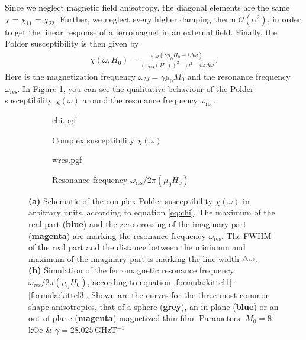 Since we neglect magnetic field anisotropy, the diagonal elements are the same $\chi=\chi_{11}=\chi_{22}$. Further, we neglect every higher damping therm $\mathcal{O}(\alpha^2)$, in order to get the linear response of a ferromagnet in an external field. Finally, the Polder susceptibility is then given by
\begin{align}
    \chi(\omega,H_0)=\frac{\omega_M\left(\gamma\mu_0H_0-i\Delta\omega\right)}
    {\left( \omega_\text{res}(H_0)\right)^2-\omega^2-i\omega\Delta\omega}\,. \label{eq:chi}
\end{align}
Here is the magnetization frequency  $\omega_M=\gamma\mu_0 M_0$ and the resonance frequency $\omega_\text{res}$. In Figure \ref{fig:theo_chi}, you can see the qualitative behaviour of the Polder susceptibility $\chi(\omega)$ around the resonance frequency $\omega_\text{res}$. \cite{schneider2007, Kalarickal2006}
\begin{figure}
     \centering
     \begin{subfigure}[b]{.33\textwidth}
         \centering
    {chi.pgf}
         \caption{Complex susceptibility $\chi(\omega)$}
         \label{fig:theo_chi}
     \end{subfigure}
     \hfill
     \begin{subfigure}[b]{.6\textwidth}
         \centering
    {wres.pgf}
         \caption{Resonance frequency $\omega_\text{res}/2\pi(\mu_0H_0)$}
         \label{fig:theo_wres}
     \end{subfigure}
        \caption[Schematic of the Polder susceptibility and simulation of the resonance frequency]{\textbf{(a)} Schematic of the complex Polder susceptibility $\chi(\omega)$ in arbitrary units, according to equation \ref{eq:chi}. The maximum of the real part (\textbf{\color{seeblau100}blue}) and the zero crossing of the imaginary part (\textbf{\color{antiseeblau100}magenta}) are marking the resonance frequency $\omega_\text{res}$. The FWHM of the real part and the distance between the minimum and maximum of the imaginary part is marking the line width $\color[rgb]{0.520000,0.520000,0.520000}\pmb{\Delta}\boldsymbol{\omega}$.
        \\\textbf{(b)} Simulation of the ferromagnetic resonance frequency $\omega_\text{res}/2\pi(\mu_0H_0)$, according to equation \ref{formula:kittel1}-\ref{formula:kittel3}. Shown are the curves for the three most common shape anisotropies, that of a sphere (\textbf{\color[rgb]{0.520000,0.520000,0.520000}grey}), an in-plane (\textbf{\color{seeblau100}blue}) or an out-of-plane (\textbf{\color{antiseeblau100}magenta}) magnetized thin film. Parameters: $M_0=8\,$kOe \& $\gamma=28.025\,$GHzT$^{-1}$}
        \label{fig:theo_chi_wres}
\end{figure}

